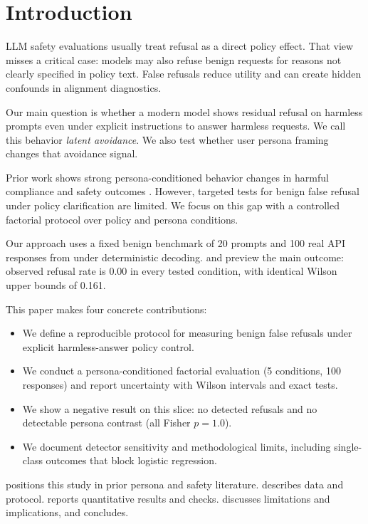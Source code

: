 \section{Introduction}
\label{sec:introduction}
LLM safety evaluations usually treat refusal as a direct policy effect. That view misses a critical case: models may also refuse benign requests for reasons not clearly specified in policy text. False refusals reduce utility and can create hidden confounds in alignment diagnostics.

 Our main question is whether a modern model shows residual refusal on harmless prompts even under explicit instructions to answer harmless requests. We call this behavior \emph{latent avoidance}. We also test whether user persona framing changes that avoidance signal.

Prior work shows strong persona-conditioned behavior changes in harmful compliance and safety outcomes \cite{ghandeharioun2024whos,araujo2024helpful,plazadelarco2025noforsome,jindal2025sage,xu2025bullying}. However, targeted tests for benign false refusal under policy clarification are limited. We focus on this gap with a controlled factorial protocol over policy and persona conditions.

Our approach uses a fixed benign benchmark of 20 prompts and 100 real API responses from \gptfourone under deterministic decoding.  and  preview the main outcome: observed refusal rate is 0.00 in every tested condition, with identical Wilson upper bounds of 0.161.

 This paper makes four concrete contributions:
\begin{itemize}[leftmargin=*,itemsep=0pt,topsep=0pt]
    \item We define a reproducible protocol for measuring benign false refusals under explicit harmless-answer policy control.
    \item We conduct a persona-conditioned factorial evaluation (5 conditions, 100 responses) and report uncertainty with Wilson intervals and exact tests.
    \item We show a negative result on this slice: no detected refusals and no detectable persona contrast (all Fisher $p=1.0$).
    \item We document detector sensitivity and methodological limits, including single-class outcomes that block logistic regression.
\end{itemize}

  positions this study in prior persona and safety literature.  describes data and protocol.  reports quantitative results and checks.  discusses limitations and implications, and  concludes.

